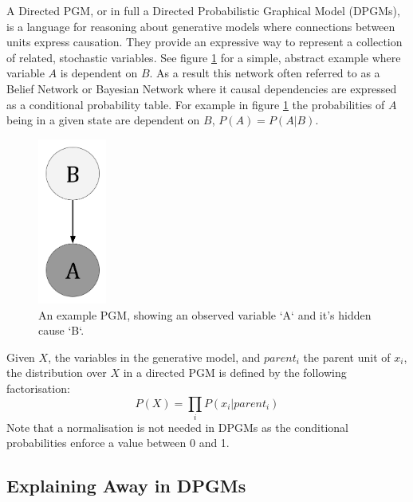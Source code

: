 A Directed PGM, or in full a Directed Probabilistic Graphical Model (DPGMs), is a language for reasoning about generative models where connections between units express causation. They provide an expressive way to represent a collection of related, stochastic variables. See figure \ref{F:PGM-example} for a simple, abstract example where variable $A$ is dependent on $B$. As a result this network often referred to as a Belief Network or Bayesian Network where it causal dependencies are expressed as a conditional probability table. For example in figure \ref{F:PGM-example} the probabilities of $A$ being in a given state are dependent on $B$, $P(A) = P(A|B)$.
\begin{figure}
\begin{center}
  \includegraphics[width = 0.2\textwidth]{Assets/PGM_Example_1.png}
\caption{An example PGM, showing an observed variable `A` and it's hidden cause `B`.}
\label{F:PGM-example}
\end{center}
\end{figure}

Given $X$, the variables in the generative model, and $parent_i$ the parent unit of $x_i$, the distribution over $X$ in a directed PGM is defined by the following factorisation:
$$
P(X) = \prod_i P(x_i | parent_i)
$$
Note that a normalisation is not needed in DPGMs as the conditional probabilities enforce a value between 0 and 1.

\subsection{Explaining Away in DPGMs}

